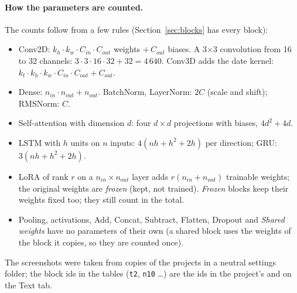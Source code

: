 \paragraph{How the parameters are counted.} The counts follow from a few rules (Section~\ref{sec:blocks} has every block):
\begin{itemize}[nosep]
  \item Conv2D: $k_h \cdot k_w \cdot C_{in} \cdot C_{out}$ weights $+\,C_{out}$ biases. A 3$\times$3 convolution from 16 to 32 channels:
        $3\cdot 3\cdot 16\cdot 32 + 32 = 4\,640$. Conv3D adds the date kernel: $k_t\cdot k_h\cdot k_w\cdot C_{in}\cdot C_{out} + C_{out}$.
  \item Dense: $n_{in}\cdot n_{out} + n_{out}$. BatchNorm, LayerNorm: $2C$ (scale and shift); RMSNorm: $C$.
  \item Self-attention with dimension $d$: four $d\times d$ projections with biases, $4d^2 + 4d$.
  \item LSTM with $h$ units on $n$ inputs: $4(nh + h^2 + 2h)$ per direction; GRU: $3(nh + h^2 + 2h)$.
  \item LoRA of rank $r$ on a $n_{in}\times n_{out}$ layer adds $r(n_{in} + n_{out})$ trainable weights; the original weights are
        \emph{frozen} (kept, not trained). \emph{Frozen} blocks keep their weights fixed too; they still count in the total.
  \item Pooling, activations, Add, Concat, Subtract, Flatten, Dropout and \emph{Shared weights} have no parameters of their own (a shared
        block uses the weights of the block it copies, so they are counted once).
\end{itemize}
The screenshots were taken from copies of the projects in a neutral settings folder; the block ids in the tables (\texttt{t2},
\texttt{n10} \ldots) are the ids in the project's  and on the Text tab.


